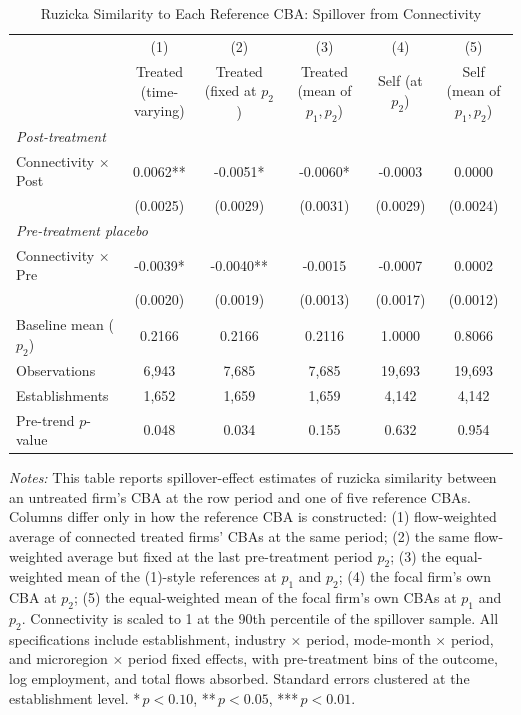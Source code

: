 \begin{table}[H]
\centering
\caption{Ruzicka Similarity to Each Reference CBA: Spillover from Connectivity}
\label{tab:cba_sim_multi_ref_ruzicka}
\scriptsize
\setlength{\tabcolsep}{6pt}
\begin{tabular}{lccccc}
\hline\hline
 & (1) & (2) & (3) & (4) & (5) \\
 & \shortstack{Treated\\(time-varying)} & \shortstack{Treated\\(fixed at $p_2$)} & \shortstack{Treated\\(mean of $p_1, p_2$)} & \shortstack{Self\\(at $p_2$)} & \shortstack{Self\\(mean of $p_1, p_2$)} \\
\hline
\multicolumn{6}{l}{\textit{Post-treatment}} \\
Connectivity $\times$ Post & 0.0062** & -0.0051* & -0.0060* & -0.0003 & 0.0000 \\
 & (0.0025) & (0.0029) & (0.0031) & (0.0029) & (0.0024) \\
\multicolumn{6}{l}{\textit{Pre-treatment placebo}} \\
Connectivity $\times$ Pre & -0.0039* & -0.0040** & -0.0015 & -0.0007 & 0.0002 \\
 & (0.0020) & (0.0019) & (0.0013) & (0.0017) & (0.0012) \\
\hline
Baseline mean ($p_2$) & 0.2166 & 0.2166 & 0.2116 & 1.0000 & 0.8066 \\
Observations & 6,943 & 7,685 & 7,685 & 19,693 & 19,693 \\
Establishments & 1,652 & 1,659 & 1,659 & 4,142 & 4,142 \\
Pre-trend $p$-value & 0.048 & 0.034 & 0.155 & 0.632 & 0.954 \\
\hline\hline
\end{tabular}
\begin{minipage}{\linewidth}
\smallskip
\scriptsize\textit{Notes:} This table reports spillover-effect estimates of ruzicka similarity between an untreated firm's CBA at the row period and one of five reference CBAs. Columns differ only in how the reference CBA is constructed: (1) flow-weighted average of connected treated firms' CBAs at the same period; (2) the same flow-weighted average but fixed at the last pre-treatment period $p_2$; (3) the equal-weighted mean of the (1)-style references at $p_1$ and $p_2$; (4) the focal firm's own CBA at $p_2$; (5) the equal-weighted mean of the focal firm's own CBAs at $p_1$ and $p_2$. Connectivity is scaled to 1 at the 90th percentile of the spillover sample. All specifications include establishment, industry $\times$ period, mode-month $\times$ period, and microregion $\times$ period fixed effects, with pre-treatment bins of the outcome, log employment, and total flows absorbed. Standard errors clustered at the establishment level. *\,$p<0.10$, **\,$p<0.05$, ***\,$p<0.01$.
\end{minipage}
\end{table}
